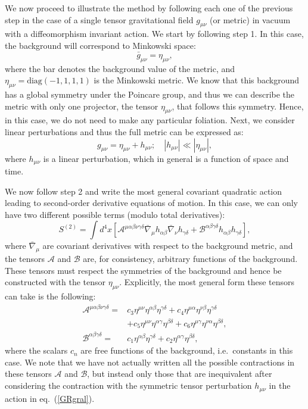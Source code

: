\documentclass[10pt,twocolumn,preprintnumbers,amsmath,amssymb,nofootinbib
,superscriptaddress]{revtex4-1}
\begin{document}
We now proceed to illustrate the method by following each one of the previous step in the case of a single tensor gravitational field $g_{\mu\nu}$ (or metric) in vacuum with a diffeomorphism invariant action. We start by following step 1. In this case, the background will correspond to Minkowski space: 
\begin{equation}
\bar{g}_{\mu\nu}=\eta_{\mu\nu},
\end{equation}
where the bar denotes the background value of the metric, and $\eta_{\mu\nu}=\text{diag}(-1,1,1,1)$ is the Minkowski metric. We know that this background has a global symmetry under the Poincare group, and thus we can describe the metric with only one projector, the tensor $\eta_{\mu\nu}$, that follows this symmetry. Hence, in this case, we do not need to make any particular foliation. Next, we consider linear perturbations and thus the full metric can be expressed as:
\begin{equation}
g_{\mu\nu}=\eta_{\mu\nu}+ h_{\mu\nu}; \quad | h_{\mu\nu}| \ll |\eta_{\mu\nu}|,
\end{equation}
where $h_{\mu\nu}$ is a linear perturbation, which in general is a function of space and time.

We now follow step 2 and write the most general covariant quadratic action leading to second-order derivative equations of motion. In this case, we can only have two different possible terms (modulo total derivatives):
\begin{equation}\label{GRgral}
S^{(2)}=\int d^4x \left[ \mathcal{A}^{\mu\alpha\beta\nu\gamma\delta}\bar{\nabla}_\mu h_{\alpha\beta} \bar{\nabla}_\nu h_{\gamma\delta} + \mathcal{B}^{\alpha\beta\gamma\delta}h_{\alpha\beta}h_{\gamma\delta}\right],
\end{equation} 
where $\bar{\nabla}_\mu$ are covariant derivatives with respect to the background metric, and the tensors $\mathcal{A}$ and $\mathcal{B}$ are, for consistency, arbitrary functions of the background. These tensors must respect the symmetries of the background and hence be constructed with the tensor $\eta_{\mu\nu}$. Explicitly, the most general form these tensors can take is the following:
\begin{align}\label{GRCoeffs}
\mathcal{A}^{\mu\alpha\beta\nu\gamma\delta} = & c_3 \eta^{\mu\nu}\eta^{\alpha\beta}\eta^{\gamma\delta}+ c_4 \eta^{\mu\alpha}\eta^{\nu\beta}\eta^{\gamma\delta} \nonumber \\ &+ c_5\eta^{\mu \nu}\eta^{\alpha\gamma}\eta^{\beta\delta} + c_6\eta^{\mu\gamma}\eta^{\nu\alpha}\eta^{\beta\delta}, \nonumber\\
\mathcal{B}^{\alpha\beta\gamma\delta} = & c_1 \eta^{\alpha\beta}\eta^{\gamma\delta}+ c_2 \eta^{\alpha\gamma}\eta^{\beta\delta},
\end{align}
where the scalars $c_n$ are free functions of the background, i.e.~constants in this case. We note that we have not actually written all the possible contractions in these tensors $\mathcal{A}$ and $\mathcal{B}$, but instead only those that are inequivalent after considering the contraction with the symmetric tensor perturbation $h_{\mu\nu}$ in the action in eq.~(\ref{GRgral}). 
\end{document}
